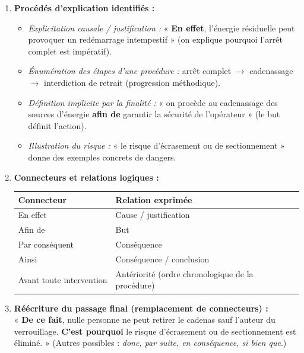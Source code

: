 \documentclass[11pt]{article}
\begin{document}
\begin{corrige}
\begin{enumerate}
    \item \textbf{Procédés d'explication identifiés :}
    \begin{itemize}
        \item \emph{Explicitation causale / justification :} « \textbf{En effet}, l'énergie résiduelle peut provoquer un redémarrage intempestif » (on explique pourquoi l'arrêt complet est impératif).
        \item \emph{Énumération des étapes d'une procédure :} arrêt complet $\rightarrow$ cadenassage $\rightarrow$ interdiction de retrait (progression méthodique).
        \item \emph{Définition implicite par la finalité :} « on procède au cadenassage des sources d'énergie \textbf{afin de} garantir la sécurité de l'opérateur » (le but définit l'action).
        \item \emph{Illustration du risque :} « le risque d'écrasement ou de sectionnement » donne des exemples concrets de dangers.
    \end{itemize}
    \item \textbf{Connecteurs et relations logiques :}
    \begin{center}
    \begin{tabularx}{\linewidth}{|l|X|}\hline
    \textbf{Connecteur} & \textbf{Relation exprimée} \\ \hline
    En effet & Cause / justification \\ \hline
    Afin de & But \\ \hline
    Par conséquent & Conséquence \\ \hline
    Ainsi & Conséquence / conclusion \\ \hline
    Avant toute intervention & Antériorité (ordre chronologique de la procédure) \\ \hline
    \end{tabularx}
    \end{center}
    \item \textbf{Réécriture du passage final (remplacement de connecteurs) :}\\
    « \textbf{De ce fait}, nulle personne ne peut retirer le cadenas sauf l'auteur du verrouillage. \textbf{C'est pourquoi} le risque d'écrasement ou de sectionnement est éliminé. » (Autres possibles : \emph{donc, par suite, en conséquence, si bien que}.)
\end{enumerate}
\end{corrige}
\end{document}
